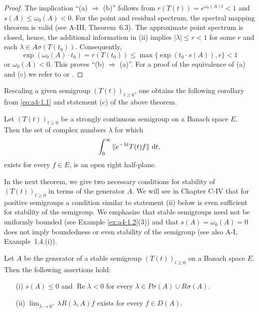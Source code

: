 \begin{proof} The implication ``(a) \( \Rightarrow \) (b)'' follows from \( r(T(t)) = e^{\omega_0(A) t} < 1 \) and \( s(A) \leq \omega_0(A) < 0 \). For the point and residual spectrum, the spectral mapping theorem is valid (see A-III, Theorem~6.3). The approximate point spectrum is closed, hence, the additional information in (ii)
implies \( |\lambda| \leq r < 1 \) for some \( r \) and each \( \lambda \in A\sigma(T(t_0)) \). 
Consequently, 
\[
\exp(\omega_0(A) \cdot t_0) = r(T(t_0)) \leq \max\{\exp(t_0 \cdot s(A)), r\} < 1
\]
or \( \omega_0(A) < 0 \). 
This proves \textquotedblleft (b) \(\Rightarrow\) (a)\textquotedblright. 
For a proof of the equivalence of (a) and (c) we refer to \citet{datko:1972} or \citet[Thm.4.4.1]{pazy:1983}. 
\end{proof}

\medskip\noindent
Rescaling a given semigroup \( (T(t))_{t \geq 0} \), one obtains the following corollary from \eqref{eq:a4-1.1} and statement (c) of the above theorem.

\medskip
\begin{corollary} \label{cor:a4-1.12} 
Let \( (T(t))_{t \geq 0} \) be a strongly continuous semigroup on a Banach space \( E \). Then the set of complex numbers \( \lambda \) for which
\[
\int_{0}^{\infty} \|e^{-\lambda t} T (t) f \| \,\mathop{}\!\mathrm{d}{t},
\]
exists for every \( f \in E \), is an open right half-plane.
\end{corollary}
\medskip

\noindent
In the next theorem, we give two necessary conditions for stability of \( (T(t))_{t \geq 0} \) in terms of the generator \( A \). We will see in Chapter C-IV that for positive semigroups a condition similar to statement (ii) below is even sufficient for stability of the semigroup. We emphasize that stable semigroups need not be uniformly bounded (see Example \ref{ex:a4-1.2}(3)) and that \( s(A) = \omega_0(A) = 0 \) does not imply boundedness or even stability of the semigroup (see also A-I, Example~1.4.(i)).

\begin{theorem} \label{thm:a4-1.13} Let \( A \) be the generator of a stable semigroup \( (T(t))_{t \geq 0} \) on a Banach space \( E \). Then the following assertions hold:

\begin{itemize}
    \item[(i)] \( s(A) \leq 0 \) and \( \operatorname{Re} \lambda < 0 \) for every \( \lambda \in P\sigma (A) \cup R\sigma(A) \).
    \item[(ii)] \( \lim_{\lambda \to 0^+} \lambda R(\lambda, A) f \) exists for every \( f \in D(A) \).
\end{itemize}
\end{theorem}
\medskip

